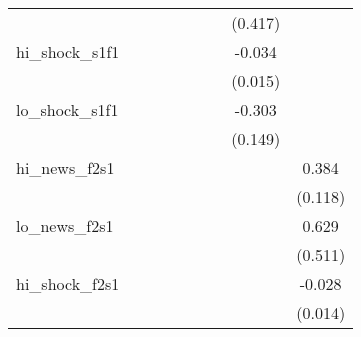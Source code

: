 {\begin{tabular}{l*{8}{c}}
            &                     &                     &                     &                     &                     &                     &     (0.417)         &                     \\
\addlinespace
hi\_shock\_s1f1&                     &                     &                     &                     &                     &                     &      -0.034\sym{**} &                     \\
            &                     &                     &                     &                     &                     &                     &     (0.015)         &                     \\
\addlinespace
lo\_shock\_s1f1&                     &                     &                     &                     &                     &                     &      -0.303\sym{*}  &                     \\
            &                     &                     &                     &                     &                     &                     &     (0.149)         &                     \\
\addlinespace
hi\_news\_f2s1&                     &                     &                     &                     &                     &                     &                     &       0.384\sym{***}\\
            &                     &                     &                     &                     &                     &                     &                     &     (0.118)         \\
\addlinespace
lo\_news\_f2s1&                     &                     &                     &                     &                     &                     &                     &       0.629         \\
            &                     &                     &                     &                     &                     &                     &                     &     (0.511)         \\
\addlinespace
hi\_shock\_f2s1&                     &                     &                     &                     &                     &                     &                     &      -0.028\sym{*}  \\
            &                     &                     &                     &                     &                     &                     &                     &     (0.014)         \\

\end{tabular}}
